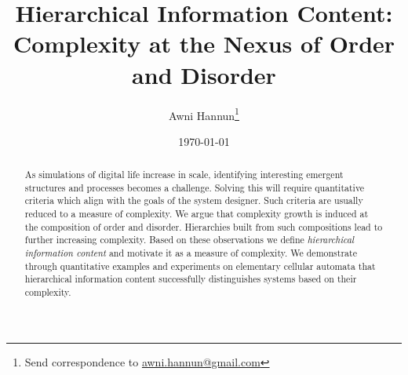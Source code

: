 \documentclass[12pt]{article}
\title{Hierarchical Information Content:\\
    Complexity at the Nexus of Order and Disorder}
\author{Awni Hannun\footnote{
  Send correspondence to
  \href{mailto:awni.hannun@gmail.com}{awni.hannun@gmail.com}}}
\date{\today}
\theoremstyle{definition}
\begin{document}
\maketitle

\begin{abstract}
  As simulations of digital life increase in scale, identifying interesting
  emergent structures and processes becomes a challenge.  Solving this will
  require quantitative criteria which align with the goals of the system
  designer. Such criteria are usually reduced to a measure of complexity. We
  argue that complexity growth is induced at the composition of order and
  disorder. Hierarchies built from such compositions lead to further increasing
  complexity. Based on these observations we define \emph{hierarchical
  information content} and motivate it as a measure of complexity. We
  demonstrate through quantitative examples and experiments on elementary
  cellular automata that hierarchical information content successfully
  distinguishes systems based on their complexity.
\end{abstract}








\end{document}

